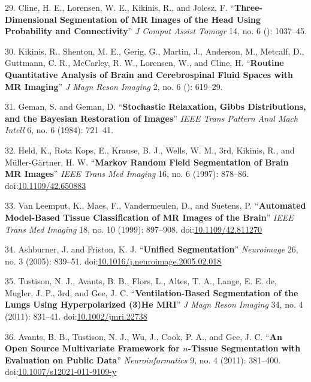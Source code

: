 \documentclass[11pt,]{article}
\begin{document}
\hypertarget{ref-Cline:1990aa}{}
29. Cline, H. E., Lorensen, W. E., Kikinis, R., and Jolesz, F.
``\textbf{Three-Dimensional Segmentation of MR Images of the Head Using
Probability and Connectivity}'' \emph{J Comput Assist Tomogr} 14, no. 6
(): 1037--45.

\hypertarget{ref-Kikinis:1992aa}{}
30. Kikinis, R., Shenton, M. E., Gerig, G., Martin, J., Anderson, M.,
Metcalf, D., Guttmann, C. R., McCarley, R. W., Lorensen, W., and Cline,
H. ``\textbf{Routine Quantitative Analysis of Brain and Cerebrospinal
Fluid Spaces with MR Imaging}'' \emph{J Magn Reson Imaging} 2, no. 6 ():
619--29.

\hypertarget{ref-Geman:1984aa}{}
31. Geman, S. and Geman, D. ``\textbf{Stochastic Relaxation, Gibbs
Distributions, and the Bayesian Restoration of Images}'' \emph{IEEE
Trans Pattern Anal Mach Intell} 6, no. 6 (1984): 721--41.

\hypertarget{ref-Held:1997aa}{}
32. Held, K., Rota Kops, E., Krause, B. J., Wells, W. M., 3rd, Kikinis,
R., and Müller-Gärtner, H. W. ``\textbf{Markov Random Field Segmentation
of Brain MR Images}'' \emph{IEEE Trans Med Imaging} 16, no. 6 (1997):
878--86. doi:\href{https://doi.org/10.1109/42.650883}{10.1109/42.650883}

\hypertarget{ref-Van-Leemput:1999aa}{}
33. Van Leemput, K., Maes, F., Vandermeulen, D., and Suetens, P.
``\textbf{Automated Model-Based Tissue Classification of MR Images of
the Brain}'' \emph{IEEE Trans Med Imaging} 18, no. 10 (1999): 897--908.
doi:\href{https://doi.org/10.1109/42.811270}{10.1109/42.811270}

\hypertarget{ref-Ashburner:2005aa}{}
34. Ashburner, J. and Friston, K. J. ``\textbf{Unified Segmentation}''
\emph{Neuroimage} 26, no. 3 (2005): 839--51.
doi:\href{https://doi.org/10.1016/j.neuroimage.2005.02.018}{10.1016/j.neuroimage.2005.02.018}

\hypertarget{ref-Tustison:2011aa}{}
35. Tustison, N. J., Avants, B. B., Flors, L., Altes, T. A., Lange, E.
E. de, Mugler, J. P., 3rd, and Gee, J. C. ``\textbf{Ventilation-Based
Segmentation of the Lungs Using Hyperpolarized (3)He MRI}'' \emph{J Magn
Reson Imaging} 34, no. 4 (2011): 831--41.
doi:\href{https://doi.org/10.1002/jmri.22738}{10.1002/jmri.22738}

\hypertarget{ref-Avants:2011aa}{}
36. Avants, B. B., Tustison, N. J., Wu, J., Cook, P. A., and Gee, J. C.
``\textbf{An Open Source Multivariate Framework for \(n\)-Tissue
Segmentation with Evaluation on Public Data}'' \emph{Neuroinformatics}
9, no. 4 (2011): 381--400.
doi:\href{https://doi.org/10.1007/s12021-011-9109-y}{10.1007/s12021-011-9109-y}
\end{document}
